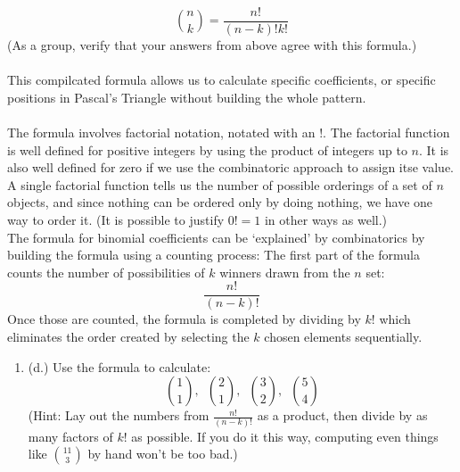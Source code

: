 \documentclass{ximera}
\begin{document}
\begin{exercise}
    \[{n\choose k}=\frac{n!}{(n-k)!k!}\]
    (As a group, verify that your answers from above agree with this formula.)\\
    \\
    This compilcated formula allows us to calculate specific coefficients, or specific positions in Pascal's Triangle without building the whole pattern.\\
    \\
    The formula involves factorial notation, notated with an $!$.  The factorial function is well defined for positive integers by using the product of integers up to $n$.  It is also well defined for zero if we use the combinatoric approach to assign itse value.  A single factorial function tells us the number of possible orderings of a set of $n$ objects, and since nothing can be ordered only by doing nothing, we have one way to order it.  (It is possible to justify $0!=1$ in other ways as well.)\\
    The formula for binomial coefficients can be `explained' by combinatorics by building the formula using a counting process: The first part of the formula counts the number of possibilities of $k$ winners drawn from the $n$ set: 
    \[\frac{n!}{(n-k)!}\]
    Once those are counted, the formula is completed by dividing by $k!$ which eliminates the order created by selecting the $k$ chosen elements sequentially.\\
    \begin{enumerate}
        \item (d.) Use the formula to calculate: 
        \[{1\choose 1}, \,\,\, {2\choose 1}, \,\,\, {3\choose 2}, \,\,\, {5 \choose 4}\]
        (Hint: Lay out the numbers from $\frac{n!}{(n-k)!}$ as a product, then divide by as many factors of $k!$ as possible.  If you do it this way, computing even things like $11\choose 3$ by hand won't be too bad.) 
    \end{enumerate}
\end{exercise}
\end{document}
